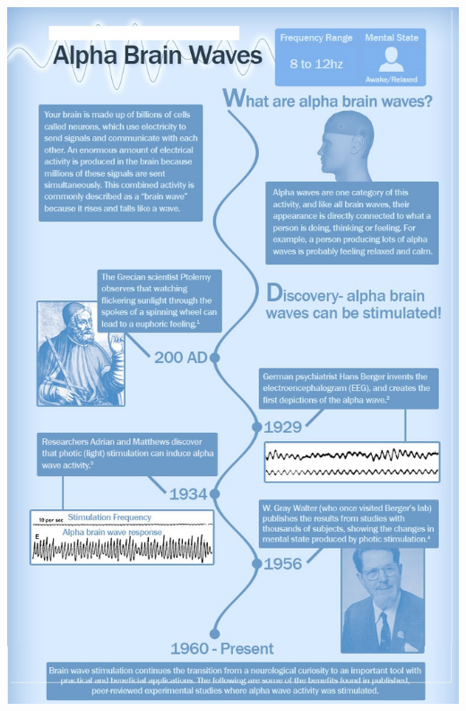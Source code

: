 \documentclass[10pt]{article}
\begin{document}
\begin{center}
	\graphicspath{ {images/} }
	\includegraphics[width=16cm, height=23cm]{Alpha_waves}
\end{center}
\end{document}
